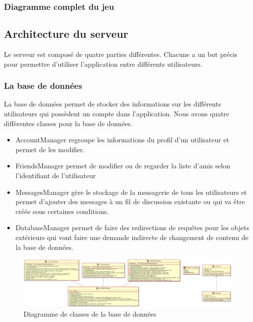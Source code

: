 \documentclass{article}
\begin{document}
\subsubsection{Diagramme complet du jeu}


\subsection{Architecture du serveur}

Le serveur est composé de quatre parties différentes. Chacune a un but précis pour permettre d'utiliser l'application entre différents utilisateurs.

\subsubsection{La base de données}

La base de données permet de stocker des informations sur les différents utilisateurs qui possèdent un compte dans l'application. Nous avons quatre différentes classes pour la base de données. 
\begin{itemize}
	\item AccountManager regroupe les informations du profil d'un utilisateur et permet de les modifier.
	\item FriendsManager permet de modifier ou de regarder la liste d'amis selon l'identifiant de l'utilisateur
	\item MessagesManager gère le stockage de la messagerie de tous les utilisateurs et permet d'ajouter des messages à un fil de discussion existante ou qui va être créée sous certaines conditions. 
	\item DatabaseManager permet de faire des redirections de requêtes pour les objets extérieurs qui vont faire une demande indirecte de changement de contenu de la base de données.
\end{itemize}

\begin{figure}[!ht]
	\centering
	 \includegraphics[scale=0.2]{../res/uml/class/DatabaseClass.png}
	 \caption{Diagramme de classes de la base de données}
	 \label{fig:DatabaseDiagram}
\end{figure}
\end{document}
